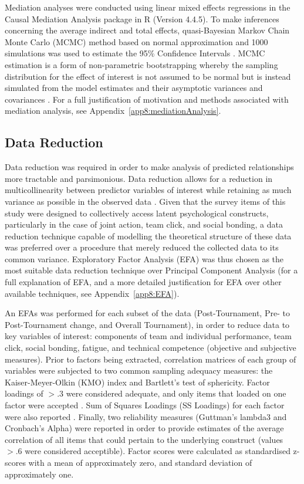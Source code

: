 \begin{CJK}{UTF8}{gbsn}
Mediation analyses were conducted using linear mixed effects regressions in the Causal Mediation Analysis package in R (Version 4.4.5).  To make inferences concerning the average indirect and total effects, quasi-Bayesian Markov Chain Monte Carlo (MCMC) method based on normal approximation and 1000 simulations was used to estimate the 95\% Confidence Intervals \citep{Tofighi2016a,Imai2010}. MCMC estimation is a form of non-parametric bootstrapping whereby the sampling distribution for the effect of interest is not assumed to be normal but is instead simulated from the model estimates and their asymptotic variances and covariances \citep{Preacher2008}.  For a full justification of motivation and methods associated with mediation analysis, see Appendix~\ref{app8:mediationAnalysis}.

\subsection{Data Reduction\label{Ch5:dataReduction}}
Data reduction was required in order to make analysis of predicted relationships more tractable and parsimonious.  Data reduction allows for a reduction in multicollinearity between predictor variables of interest while retaining as much variance as possible in the observed data \citep{Yong2013}.  Given that the survey items of this study were designed to collectively access latent psychological constructs, particularly in the case of joint action, team click, and social bonding, a data reduction technique capable of modelling the theoretical structure of these data was preferred over a procedure that merely reduced the collected data to its common variance. Exploratory Factor Analysis (EFA) was thus chosen as the most suitable data reduction technique over Principal Component Analysis (for a full explanation of EFA, and a more detailed justification for EFA over other available techniques, see Appendix~\ref{app8:EFA}).

An EFAs was performed for each subset of the data (Post-Tournament, Pre- to Post-Tournament change, and Overall Tournament), in order to reduce data to key variables of interest: components of team and individual performance, team click, social bonding, fatigue, and technical competence (objective and subjective measures).  Prior to factors being extracted, correlation matrices of each group of variables were subjected to two common sampling adequacy measures: the Kaiser-Meyer-Olkin (KMO) index and Bartlett’s test of sphericity.  Factor loadings of $> .3$ were considered adequate, and only items that loaded on one factor were accepted \citep{Field2012}. Sum of Squares Loadings (SS Loadings) for each factor were also reported \citep{Dziuban1974}.  Finally, two reliability measures (Guttman's lambda3 and Cronbach's Alpha) were reported in order to provide estimates of the average correlation of all items that could pertain to the underlying construct (values  $> .6$ were considered acceptible).  Factor scores were calculated as standardised z-scores with a mean of approximately zero, and standard deviation of approximately one.


\end{CJK}
